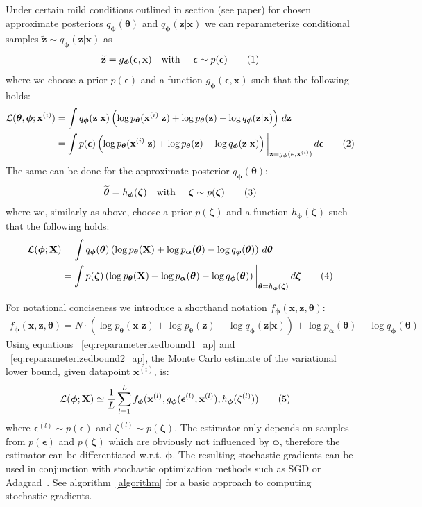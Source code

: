 \documentclass{article} %
\theoremstyle{definition}
\newcommand{\bb}[1]{\mathbf{#1}}
\newcommand{\bx}{\bb{x}}
\newcommand{\bxi}{\bx^{(i)}}
\newcommand{\bxl}{\bx^{(l)}}
\newcommand{\bz}{\bb{z}}
\newcommand{\bT}{\boldsymbol{\theta}}
\newcommand{\balpha}{\boldsymbol{\alpha}}
\newcommand{\bphi}{\boldsymbol{\phi}}
\newcommand{\beps}{\boldsymbol{\epsilon}}
\newcommand{\bepsl}{\beps^{(l)}}
\newcommand{\bzeta}{\boldsymbol{\zeta}}
\newcommand{\bzetal}{\zeta^{(l)}}
\newcommand{\bX}{\bb{X}}
\newcommand{\btz}{\widetilde{\bz}}
\newcommand{\btT}{\widetilde{\bT}}
\newcommand{\pT}{p_{\bT}}
\newcommand{\pA}{p_{\balpha}}
\newcommand{\qPhi}{q_{\bphi}}
\newcommand{\fPhi}{f_{\bphi}}
\newcommand{\gPhi}{g_{\bphi}}
\newcommand{\hPhi}{h_{\bphi}}
\newcommand{\eqnr}{\addtocounter{equation}{1}\tag{\theequation}}
\theoremstyle{definition}
\begin{document}
Under certain mild conditions outlined in section (see paper) for chosen approximate posteriors $\qPhi(\bT)$ and $\qPhi(\bz|\bx)$ we can reparameterize conditional samples $\btz \sim \qPhi(\bz|\bx)$ as
\begin{align*}
\btz = \gPhi(\beps,\bx) \text{\quad with \quad} \beps \sim p(\beps)
\eqnr\end{align*}
where we choose a prior $p(\beps)$ and a function $\gPhi(\beps,\bx)$ such that the following holds:
\begin{align*}
\mathcal{L}(\bT,\bphi;\bxi)
&= \int \qPhi(\bz|\bx) \left(\log \pT(\bxi | \bz) + \log \pT(\bz) - \log \qPhi(\bz|\bx)\right) \,d\bz \\
&= \int p(\beps) \left(\log \pT(\bxi | \bz) + \log \pT(\bz) - \log \qPhi(\bz|\bx)\right) \bigg|_{\bz=\gPhi(\beps,\bxi)} \,d\beps
\eqnr\label{eq:reparameterizedbound2_ap}\end{align*}
The same can be done for the approximate posterior $\qPhi(\bT)$:
\begin{align*}
\btT = \hPhi(\bzeta) \text{\quad with \quad} \bzeta \sim p(\bzeta)
\eqnr\end{align*}
where we, similarly as above, choose a prior $p(\bzeta)$ and a function $\hPhi(\bzeta)$ such that the following holds:
\begin{align*}
\mathcal{L}(\bphi;\bX)
&= \int \qPhi(\bT) \left( \log \pT(\bX) + \log \pA(\bT) - \log \qPhi(\bT) \right) \,d\bT \\
&= \int p(\bzeta) \left( \log \pT(\bX) + \log \pA(\bT) - \log \qPhi(\bT) \right) \bigg|_{\bT=\hPhi(\bzeta)} \,d\bzeta
\eqnr\label{eq:reparameterizedbound1_ap}\end{align*}

For notational conciseness we introduce a shorthand notation $\fPhi(\bx, \bz, \bT)$:
\begin{align}
\fPhi(\bx, \bz, \bT) = N \cdot (\log \pT(\bx | \bz) + \log \pT(\bz) - \log \qPhi(\bz|\bx)) + \log \pA(\bT) - \log \qPhi(\bT)
\label{eq:f_ap}
\end{align}
Using equations ~\eqref{eq:reparameterizedbound1_ap} and ~\eqref{eq:reparameterizedbound2_ap}, the Monte Carlo estimate of the variational lower bound, given datapoint $\bxi$, is:
\begin{align*}
\mathcal{L}(\bphi;\bX)
&\simeq \frac{1}{L} \sum_{l=1}^L \fPhi(\bxl, \gPhi(\bepsl,\bxl), \hPhi(\bzetal))
\eqnr\label{eq:fullestimator_ap}\end{align*}
where $\bepsl \sim p(\beps)$ and $\bzetal \sim p(\bzeta)$. 
The estimator only depends on samples from $p(\beps)$ and $p(\bzeta)$ which are obviously not influenced by $\bphi$, therefore the estimator can be differentiated w.r.t. $\bphi$. The resulting stochastic gradients can be used in conjunction with stochastic optimization methods such as SGD or Adagrad~\cite{duchi2010adaptive}. See algorithm~\ref{algorithm} for a basic approach to computing stochastic gradients.
\end{document}
